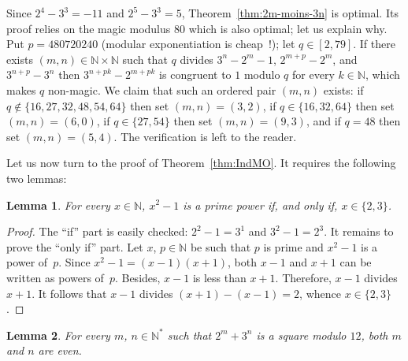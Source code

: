 \documentclass[12pt]{article}
\newcommand{\bN}{\mathbb{N}} %
\newcommand{\bNast}{\bN^*}
\newtheorem{lemma}{Lemma}
\newtheorem{proposition}{Proposition}
\theoremstyle{definition}
\begin{document}
   Since $2^4 - 3^3 = - 11$ and $2^5 - 3^3 = 5$,
   Theorem~\ref{thm:2m-moins-3n} is optimal.
   Its proof relies on the magic modulus $80$ which is also optimal; let us explain why.
   Put $p = 480720240$ (modular exponentiation is cheap~!);
   let $q \in [2, 79]$.
   If there exists $(m, n) \in \bN \times \bN$ such that
   $q$ divides $3^n - 2^m - 1$, $2^{m + p} - 2^m$, and $3^{n + p} - 3^n$
   then
   $3^{n + pk} - 2^{m + pk}$ is congruent to $1$ modulo $q$ for every $k \in \bN$,
   which makes $q$ non-magic. 
   We claim that such an ordered pair $(m, n)$ exists: 
   if $q \notin \{ 16, 27, 32, 48, 54, 64 \}$ then set $(m, n) = (3, 2)$,
   if $q \in \{ 16, 32, 64 \}$ then set $(m, n) = (6, 0)$, 
   if $q \in \{ 27, 54 \}$ then set $(m, n) = (9, 3)$, and 
   if $q = 48$ then set $(m, n) = (5, 4)$.
   The verification is left to the reader.

   
   Let us now turn to the proof of Theorem~\ref{thm:IndMO}.
   It requires the following two lemmas:

     \begin{lemma} \label{lem:x2=q+1}
       For every $x \in \bN$, $x^2 - 1$ is a prime power if, and only if, $x \in \{ 2, 3 \}$. 
     \end{lemma}

     \begin{proof}
       The ``if'' part is easily checked: $2^2 - 1 = 3^1$ and $3^2 - 1 = 2^3$. 
       It remains to prove the ``only if'' part.
       Let $x$, $p \in \bN$ be such that $p$ is prime and $x^2 - 1$ is a power of~$p$.
       Since  $x^2 - 1 = (x - 1)(x + 1)$, 
       both $x - 1$ and $x + 1$ can be written as powers of~$p$.
       Besides, $x - 1$ is less than $x + 1$.
       Therefore, $x - 1$ divides $x + 1$.
       It follows that $x - 1$ divides $(x + 1) - (x - 1) = 2$,
       whence $x \in \{ 2, 3 \}$.
    \end{proof} 
    

   
   \begin{lemma} \label{lem:2m+3n-square-mod-12}
     For every $m$, $n \in \bNast$ such that $2^m + 3^n$ is a square modulo $12$,
     both $m$ and $n$ are even.
   \end{lemma}
\end{document}
